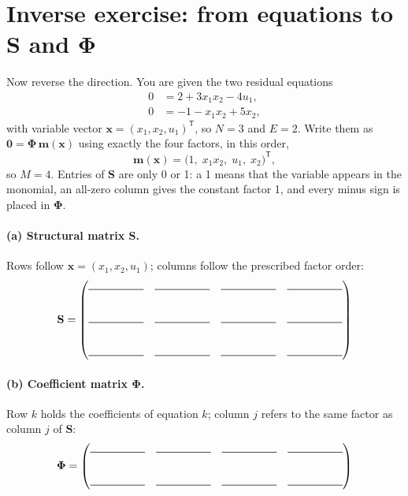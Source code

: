 \documentclass[10pt,a4paper]{article}
\newcommand{\anscell}{\rule{5em}{0.5pt}}
\begin{document}
\section{Inverse exercise: from equations to \texorpdfstring{$\mathbf{S}$ and $\boldsymbol{\Phi}$}{S and Phi}}\label{sec:inverse}
Now reverse the direction. You are given the two residual equations
\begin{align*}
  0 &= 2 + 3x_1x_2 - 4u_1,\\
  0 &= -1 - x_1x_2 + 5x_2,
\end{align*}
with variable vector $\mathbf x=(x_1,x_2,u_1)^\mathsf T$, so $N=3$ and $E=2$.
Write them as $\mathbf 0=\boldsymbol{\Phi}\,\mathbf m(\mathbf x)$ using exactly the four
factors, in this order,
\[
 \mathbf m(\mathbf x)=\bigl(1,\;x_1x_2,\;u_1,\;x_2\bigr)^\mathsf T,
\]
so $M=4$. Entries of $\mathbf{S}$ are only 0 or 1: a 1 means that the variable appears in
the monomial, an all-zero column gives the constant factor 1, and every minus
sign is placed in $\boldsymbol{\Phi}$.

\paragraph{(a) Structural matrix $\mathbf{S}$.} Rows follow $\mathbf x=(x_1,x_2,u_1)$;
columns follow the prescribed factor order:
\begingroup
\renewcommand{\arraystretch}{2}
\setlength{\arraycolsep}{16pt}
\[
 \mathbf{S}=\begin{pmatrix}
  \anscell&\anscell&\anscell&\anscell\\[18pt]
  \anscell&\anscell&\anscell&\anscell\\[18pt]
  \anscell&\anscell&\anscell&\anscell
 \end{pmatrix}
\]
\endgroup
\vspace{6pt}

\paragraph{(b) Coefficient matrix $\boldsymbol{\Phi}$.} Row $k$ holds the coefficients of
equation $k$; column $j$ refers to the same factor as column $j$ of $\mathbf{S}$:
\begingroup
\renewcommand{\arraystretch}{2}
\setlength{\arraycolsep}{16pt}
\[
 \boldsymbol{\Phi}=\begin{pmatrix}
  \anscell&\anscell&\anscell&\anscell\\[18pt]
  \anscell&\anscell&\anscell&\anscell
 \end{pmatrix}
\]
\endgroup
\vspace{6pt}
\end{document}
